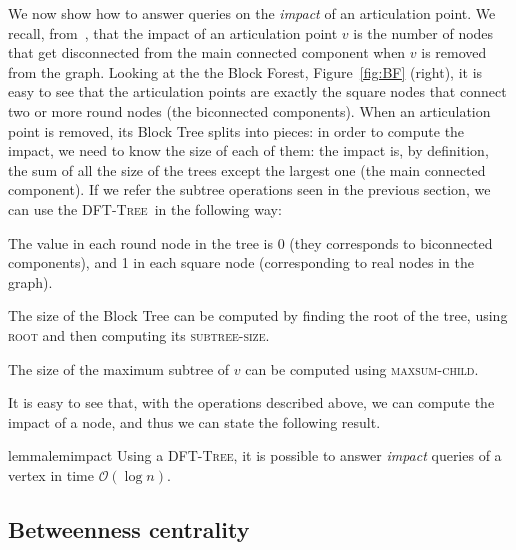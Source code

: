 \documentclass[a4paper,USenglish]{lipics}
\newcommand{\bigoh}{\mathcal{O}}
\newcommand{\dft}{\textsc{DFT-Tree}}
\begin{document}
We now show how to answer queries on the \emph{impact} of an articulation point. We recall, from~\cite{AFL12trac}, that the impact of an articulation point $v$ is the number of nodes that get disconnected from the main connected component when $v$ is removed from the graph. Looking at the the Block Forest, Figure~\ref{fig:BF} (right), it is easy to see that the articulation points are exactly the square nodes that connect two or more round nodes (the biconnected components). When an articulation point is removed, its Block Tree splits into pieces: in order to compute the impact, we need to know the size of each of them: the impact is, by definition, the sum of all the size of the trees except the largest one (the main connected component). If we refer the subtree operations seen in the previous section, we can use the \dft\ in the following way:
\begin{compactitem}
\item The value in each round node in the tree is 0 (they corresponds to biconnected components), and 1 in each square node (corresponding to real nodes in the graph).
\item The size of the Block Tree can be computed by finding the root of the tree, using \textsc{root} and then computing its \textsc{subtree-size}.
\item The size of the maximum subtree of $v$ can be computed using \textsc{maxsum-child}.
\end{compactitem}
It is easy to see that, with the operations described above, we can compute the impact of a node, and thus we can state the following result.

\begin{restatable}{lemma}{lemimpact}
Using a \dft, it is possible to answer \emph{impact} queries of a vertex in time $\bigoh (\log n)$.
\end{restatable}

\subsection{Betweenness centrality}
\end{document}
